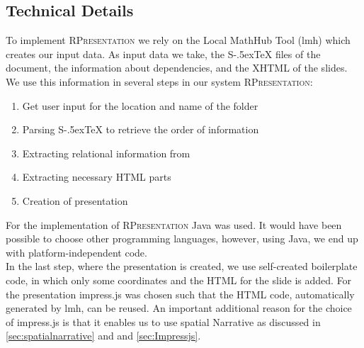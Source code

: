 \documentclass[twoside, 12pt]{article}
\def\stex{\texorpdfstring{\raisebox{-.5ex}S\kern-.5ex\TeX}{sTeX}\xspace}
\def\sTeX{\stex}
\newcommand{\sys}{\textsc{RPresentation}\xspace}
\begin{document}


\subsection{Technical Details}
\label{sec:wp4}

To implement \sys we rely on the Local MathHub Tool (lmh) which creates our input data. As input data we take, the \sTeX files of the document, the information about dependencies, and the XHTML of the slides. We use this information in several steps in our system \sys:

\begin{enumerate}[topsep=0pt,itemsep=-1ex,partopsep=1ex,parsep=1ex]
\item Get user input for the location and name of the folder
\item Parsing \sTeX to retrieve the order of information
\item Extracting relational information from 
\item Extracting necessary HTML parts
\item Creation of presentation
\end{enumerate}

For the implementation of  \sys Java was used. It would have been possible to choose other programming languages, however, using Java, we end up with platform-independent code.\\

In the last step, where the presentation is created, we use self-created boilerplate code, in which only some coordinates and the HTML for the slide is added. For the presentation impress.js was chosen such that the HTML code, automatically generated by lmh, can be reused. An important additional reason for the choice of impress.js is that it enables us to use spatial Narrative as discussed in \autoref{sec:spatialnarrative} and and \autoref{sec:Impressjs}.\\
\end{document}
